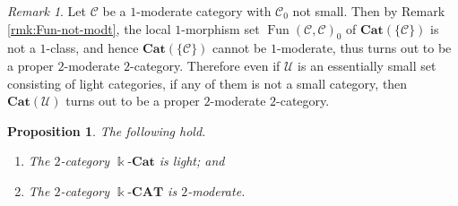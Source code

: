 \documentclass{surv-l}
\numberwithin{equation}{chapter}
\numberwithin{figure}{chapter}
\theoremstyle{plain}
\newtheorem{prp}[thm]{Proposition}
\theoremstyle{definition}
\theoremstyle{remark}
\newtheorem{rmk}[thm]{Remark}
\newcommand{\kCAT}{\Bbbk\text{-}\mathbf{CAT}}
\newcommand{\kCat}{\Bbbk\text{-}\mathbf{Cat}}
\DeclareMathOperator{\Fun}{Fun}
\begin{document}
\begin{rmk}\label{rmk:proper-2-modt}
Let ${\mathcal{C}}$ be a $1$-moderate category
with ${\mathcal{C}}_0$ not small.
Then by Remark \ref{rmk:Fun-not-modt}, the local $1$-morphism set
$\Fun({\mathcal{C}}, {\mathcal{C}})_0$ of $\mathbf{Cat}(\{{\mathcal{C}}\})$ is not a $1$-class, and hence
$\mathbf{Cat}(\{{\mathcal{C}}\})$ cannot be $1$-moderate, thus
turns out to be a proper $2$-moderate $2$-category.
Therefore even if $\mathcal{U}$ is an essentially small set consisting of
light categories, if any of them is not a small category, then
$\mathbf{Cat}(\mathcal{U})$ turns out to be a proper $2$-moderate $2$-category.
\end{rmk}

\begin{prp}\label{prp:lin_2-Cat}
The following hold.
\begin{enumerate}
\item
The $2$-category $\kCat$ is light; and
\item
The $2$-category $\kCAT$ is $2$-moderate.
\end{enumerate}
\end{prp}
\end{document}
